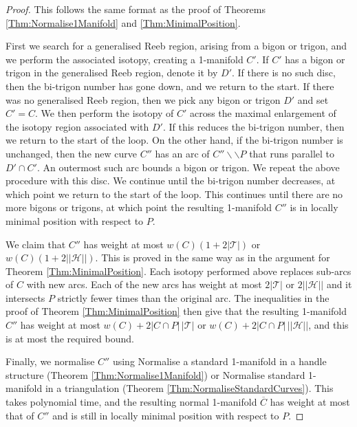 \documentclass[oneside]{amsart}
\numberwithin{equation}{section}
\theoremstyle{plain}
\theoremstyle{definition}
\newcommand{\calT}{{\mathcal{T}}}
\newcommand{\cut}{\backslash\backslash}
\newcommand{\calH}{\mathcal{H}}
\begin{document}
\begin{proof}
This follows the same format as the proof of Theorems \ref{Thm:Normalise1Manifold} and \ref{Thm:MinimalPosition}. 

First we search for a generalised Reeb region, arising from a bigon or trigon, and we perform the associated isotopy, creating a 1-manifold $C'$. If $C'$ has a bigon or trigon in the generalised Reeb region, denote it by $D'$. If there is no such disc, then the bi-trigon number has gone down, and we return to the start. If there was no generalised Reeb region, then we pick any bigon or trigon $D'$ and set $C' = C$. We then perform the isotopy of $C'$ across the maximal enlargement of the isotopy region associated with $D'$. If this reduces the bi-trigon number, then we return to the start of the loop. On the other hand, if the bi-trigon number is unchanged, then the new curve $C''$ has an arc of $C'' \cut P$ that runs parallel to $D' \cap C'$. An outermost such arc bounds a bigon or trigon. We repeat the above procedure with this disc. We continue until the bi-trigon number decreases, at which point we return to the start of the loop. This continues until there are no more bigons or trigons, at which point the resulting 1-manifold $C''$ is in locally minimal position with respect to $P$.

We claim that $C''$ has weight at most $w(C) (1 + 2 |\calT|)$ or $w(C)(1 + 2 ||\calH||)$. This is proved in the same way as in the argument for Theorem \ref{Thm:MinimalPosition}. Each isotopy performed above replaces sub-arcs of $C$ with new arcs. Each of the new arcs has weight at most $2|\calT|$ or $2||\calH||$ and it intersects $P$ strictly fewer times than the original arc. The inequalities in the proof of Theorem \ref{Thm:MinimalPosition} then give that the resulting 1-manifold $C''$ has weight at most $w(C) + 2 |C \cap P| \, |\calT|$ or $w(C) + 2 |C \cap P| \, ||\calH||$, and this is at most the required bound.

Finally, we normalise $C''$ using {\sc Normalise a standard 1-manifold in a handle structure} (Theorem \ref{Thm:Normalise1Manifold}) or {\sc Normalise standard 1-manifold in a triangulation} (Theorem \ref{Thm:NormaliseStandardCurves}). This takes polynomial time, and the resulting normal 1-manifold $\overline{C}$ has weight at most that of $C''$ and is still in locally minimal position with respect to $P$.
\end{proof}



\end{document}
